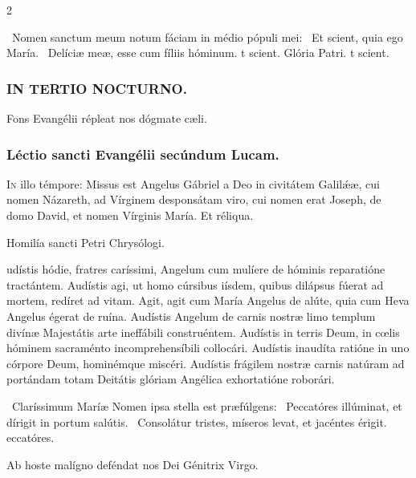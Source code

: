 \documentclass[9pt,twoside]{extarticle}
\begin{document}
\begin{multicols}{2}
\begin{tightlist}{}
\item {}~Nomen sanctum meum notum fáciam in médio pópuli mei: \textred{*}~Et scient, quia ego María. ~Delíciæ meæ, esse cum fíliis hóminum. t scient. Glória Patri. t scient.
\end{tightlist}

\subsubsection*{\center \textsc{IN TERTIO NOCTURNO.}}
\begin{tightlist}{}
\item {\small {} Fons Evangélii répleat nos dógmate cæli.}
\end{tightlist}
\subsubsection*{\center Léctio sancti Evangélii secúndum Lucam.}
\begin{center}\end{center}
\lettrine{I}n illo témpore: Missus est Angelus Gábriel a Deo in civitátem Galilǽæ, cui nomen Názareth, ad Vírginem desponsátam viro, cui nomen erat Joseph, de domo David, et nomen Vírginis María. Et réliqua.

\begin{center}Homilía sancti Petri Chrysólogi.\\
\end{center}
udístis hódie, fratres caríssimi, Angelum cum mulíere de hóminis reparatióne tractántem. Audístis agi, ut homo cúrsibus iísdem, quibus dilápsus fúerat ad mortem, redíret ad vitam. Agit, agit cum María Angelus de alúte, quia cum Heva Angelus égerat de ruína. Audístis Angelum de carnis nostræ limo templum divínæ Majestátis arte ineffábili construéntem. Audístis in terris Deum, in cœlis hóminem sacraménto incomprehensíbili collocári. Audístis inaudíta ratióne in uno córpore Deum, hominémque miscéri. Audístis frágilem nostræ carnis natúram ad portándam totam Deitátis glóriam Angélica exhortatióne roborári.

\begin{tightlist}{}
\item {}~Claríssimum Maríæ Nomen ipsa stella est præfúlgens: \textred{*}~Peccatóres illúminat, et dírigit in portum salútis. ~Consolátur tristes, míseros levat, et jacéntes érigit. eccatóres.
\item {\small {} Ab hoste malígno deféndat nos Dei Génitrix Virgo.}
\end{tightlist}


\end{multicols}
\end{document}
